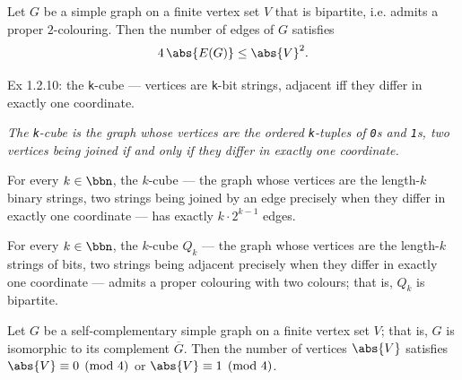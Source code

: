 \begin{theorem}
\label{SimpleGraph.bipartite_edgeCard_le}
\leanok
Let $G$ be a simple graph on a finite vertex set $V$ that is bipartite, i.e. admits a
proper $2$-colouring. Then the number of edges of $G$ satisfies \[ 4\,\abs{E(G)} \le
\abs{V}^{2}. \]
\end{theorem}

\begin{definition}
\label{SimpleGraph.hypercube}
\leanok
Ex 1.2.10: the \texttt{k}-cube --- vertices are \texttt{k}-bit strings, adjacent iff
they differ
in exactly one coordinate.

\emph{The \texttt{k}-cube is the graph whose vertices
are the ordered \texttt{k}-tuples of \texttt{0}s and \texttt{1}s, two vertices being
joined if and
only if they differ in exactly one coordinate.}
\end{definition}

\begin{theorem}
\label{SimpleGraph.hypercube_edgeCard}
\leanok
{}
For every $k \in \bbn$, the $k$-cube --- the graph whose vertices are the length-$k$
binary strings, two strings being joined by an edge precisely when they differ in
exactly one coordinate --- has exactly $k \cdot 2^{k-1}$ edges.
\end{theorem}

\begin{theorem}
\label{SimpleGraph.hypercube_bipartite}
\leanok
{}
For every $k \in \bbn$, the $k$-cube $Q_k$ --- the graph whose vertices are the
length-$k$ strings of bits, two strings being adjacent precisely when they differ in
exactly one coordinate --- admits a proper colouring with two colours; that is, $Q_k$ is
bipartite.
\end{theorem}

\begin{theorem}
\label{SimpleGraph.selfComplementary_card_mod_four}
\leanok
Let $G$ be a self-complementary simple graph on a finite vertex set $V$; that is, $G$ is
isomorphic to its complement $\overline{G}$. Then the number of vertices $\abs{V}$
satisfies $\abs{V} \equiv 0 \pmod 4$ or $\abs{V} \equiv 1 \pmod 4$.
\end{theorem}

